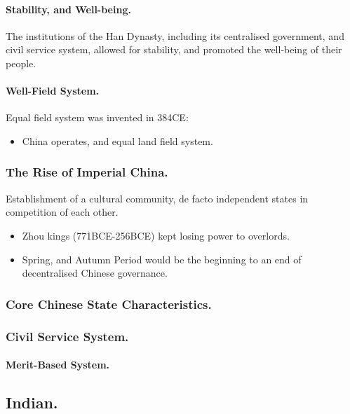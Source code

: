 \documentclass[11pt]{book}
\begin{document}
					\paragraph{Stability, and Well-being.}
						The institutions of the Han Dynasty, including its centralised government, and civil service system, allowed for stability, and promoted the well-being of their people.
					\paragraph{Well-Field System.}
						Equal field system was invented in 384CE:
						\begin{itemize}
							\item China operates, and equal land field system.
						\end{itemize}
			
				\subsubsection{The Rise of Imperial China.}
					Establishment of a cultural community, de facto independent states in competition of each other.
					\begin{itemize}
						\item Zhou kings (771BCE-256BCE) kept losing power to overlords.
						\item Spring, and Autumn Period would be the beginning to an end of decentralised Chinese governance.
					\end{itemize}
					
					
				\subsubsection{Core Chinese State Characteristics.}


				\subsubsection{Civil Service System.}
					\paragraph{Merit-Based System.}
				
			\subsection{Indian.}
\end{document}
